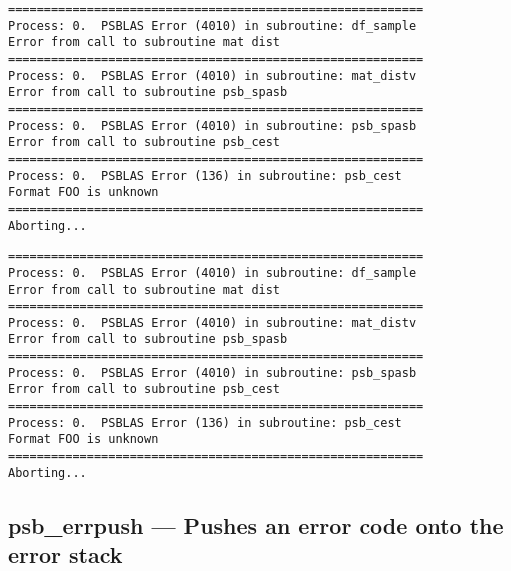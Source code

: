 \begin{listing}[h!]
\ifpdf
\begin{verbatim}
==========================================================
Process: 0.  PSBLAS Error (4010) in subroutine: df_sample           
Error from call to subroutine mat dist            
==========================================================
Process: 0.  PSBLAS Error (4010) in subroutine: mat_distv           
Error from call to subroutine psb_spasb           
==========================================================
Process: 0.  PSBLAS Error (4010) in subroutine: psb_spasb           
Error from call to subroutine psb_cest            
==========================================================
Process: 0.  PSBLAS Error (136) in subroutine: psb_cest            
Format FOO is unknown
==========================================================
Aborting...
\end{verbatim}
\else	
  \begin{Sbox}
    \begin{minipage}[tl]{0.95\textwidth}
\begin{verbatim}
==========================================================
Process: 0.  PSBLAS Error (4010) in subroutine: df_sample           
Error from call to subroutine mat dist            
==========================================================
Process: 0.  PSBLAS Error (4010) in subroutine: mat_distv           
Error from call to subroutine psb_spasb           
==========================================================
Process: 0.  PSBLAS Error (4010) in subroutine: psb_spasb           
Error from call to subroutine psb_cest            
==========================================================
Process: 0.  PSBLAS Error (136) in subroutine: psb_cest            
Format FOO is unknown
==========================================================
Aborting...
\end{verbatim}
    \end{minipage}
  \end{Sbox}
  \setlength{\fboxsep}{8pt}
  \begin{center}
    \fbox{\TheSbox}
  \end{center}
\fi
  \caption{\label{fig:errormsg}A sample PSBLAS-3.0 error
    message. Process 0 detected an error condition inside the {\textrm
    psb\_cest} subroutine}
\end{listing}


\clearpage\subsection{psb\_errpush --- Pushes an error code onto the error
  stack}


